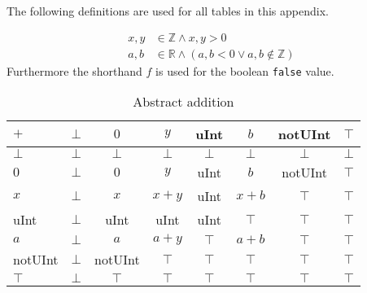 The following definitions are used for all tables in this appendix.

\begin{align*}
x, y &\in \mathbb{Z} \wedge x, y > 0 \\
a, b &\in \mathbb{R} \wedge (a, b < 0 \vee a, b \notin \mathbb{Z})
\end{align*}
Furthermore the shorthand $f$ is used for the boolean \texttt{false} value.

\begin{table}[htbp]
\centering
\begin{tabular}{l| c c c c c c c}
$+$     & $\bot$& $0$       & $y$   & uInt  & $b$   & notUInt   & $\top$ \\
\hline
$\bot$  & $\bot$& $\bot$    & $\bot$& $\bot$& $\bot$& $\bot$    & $\bot$ \\
$0$     & $\bot$& $0$       & $y$   & uInt  & $b$   & notUInt   & $\top$ \\
$x$     & $\bot$& $x$       & $x+y$ & uInt  & $x+b$ & $\top$    & $\top$ \\
uInt    & $\bot$& uInt      & uInt  & uInt  & $\top$& $\top$    & $\top$ \\
$a$     & $\bot$& $a$       & $a+y$ & $\top$& $a+b$ & $\top$    & $\top$ \\
notUInt & $\bot$& notUInt   & $\top$& $\top$& $\top$& $\top$    & $\top$ \\
$\top$  & $\bot$& $\top$    & $\top$& $\top$& $\top$& $\top$    & $\top$ \\
\end{tabular}
\caption{Abstract addition}
\label{tab:abstract_addition}
\end{table}

